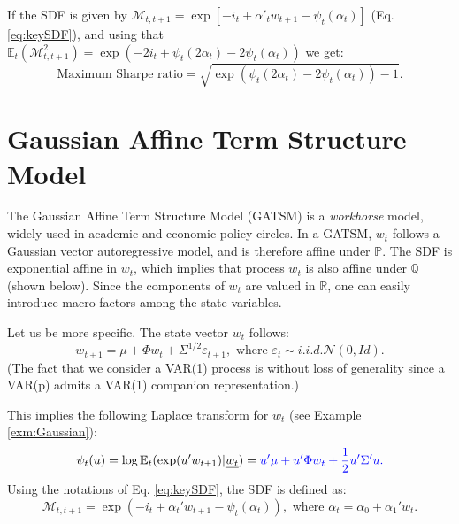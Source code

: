 \documentclass[
  12pt,
]{book}
\theoremstyle{definition}
\theoremstyle{definition}
\theoremstyle{definition}
\theoremstyle{definition}
\theoremstyle{remark}
\begin{document}
If the SDF is given by \(\mathcal{M}_{t,t+1} = \exp[-i_{t}+\alpha'_tw_{t+1}-\psi_t(\alpha_t)]\) (Eq. \eqref{eq:keySDF}), and using that \(\mathbb{E}_t(\mathcal{M}_{t,t+1}^2)=\exp(-2i_t+\psi_t(2\alpha_t)-2\psi_t(\alpha_t))\) we get:
\[
\mbox{Maximum Sharpe ratio} = \sqrt{\exp(\psi_t(2\alpha_t)-2\psi_t(\alpha_t)) - 1}.
\]

\hypertarget{RiskFreeGaussian}{%
\section{Gaussian Affine Term Structure Model}\label{RiskFreeGaussian}}

The Gaussian Affine Term Structure Model (GATSM) is a \emph{workhorse} model, widely used in academic and economic-policy circles. In a GATSM, \(w_t\) follows a Gaussian vector autoregressive model, and is therefore affine under \(\mathbb{P}\). The SDF is exponential affine in \(w_t\), which implies that process \(w_t\) is also affine under \(\mathbb{Q}\) (shown below). Since the components of \(w_t\) are valued in \(\mathbb{R}\), one can easily introduce macro-factors among the state variables.

Let us be more specific. The state vector \(w_t\) follows:
\begin{equation}
w_{t+1} = \mu + \Phi w_{t} + \Sigma^{1/2} \varepsilon_{t+1}, \mbox{ where } \varepsilon_{t} \sim  i.i.d. \mathcal{N}(0,Id).\label{eq:GaussianVAR1}
\end{equation}
(The fact that we consider a VAR(1) process is without loss of generality since a VAR(p) admits a VAR(1) companion representation.)

This implies the following Laplace transform for \(w_t\) (see Example \ref{exm:Gaussian}):
\[
\psi_t(u) = \log \mathbb{E}_t(\exp(u'w_{t+1})|\underline{w_t}) = \color{blue}{u'\mu + u'\Phi w_t + \frac{1}{2}u'\Sigma'u}.
\]
Using the notations of Eq. \eqref{eq:keySDF}, the SDF is defined as:
\[
\mathcal{M}_{t,t+1} = \exp(- i_t + \alpha_t'w_{t+1} - \psi_t(\alpha_t)), \mbox{ where } \alpha_t = \alpha_0 + \alpha_1'w_t.
\]
\end{document}
